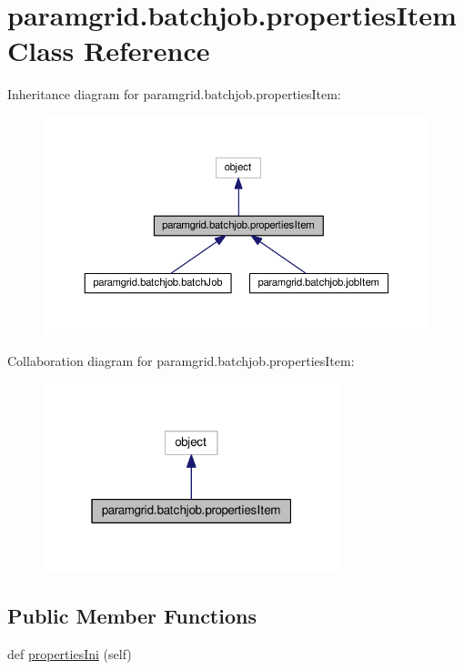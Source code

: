 \hypertarget{classparamgrid_1_1batchjob_1_1propertiesItem}{}\section{paramgrid.\+batchjob.\+properties\+Item Class Reference}
\label{classparamgrid_1_1batchjob_1_1propertiesItem}


Inheritance diagram for paramgrid.\+batchjob.\+properties\+Item\+:
\nopagebreak
\begin{figure}[H]
\begin{center}
\leavevmode
\includegraphics[width=350pt]{classparamgrid_1_1batchjob_1_1propertiesItem__inherit__graph}
\end{center}
\end{figure}


Collaboration diagram for paramgrid.\+batchjob.\+properties\+Item\+:
\nopagebreak
\begin{figure}[H]
\begin{center}
\leavevmode
\includegraphics[width=244pt]{classparamgrid_1_1batchjob_1_1propertiesItem__coll__graph}
\end{center}
\end{figure}
\subsection*{Public Member Functions}
\begin{DoxyCompactItemize}
\item 
def \mbox{\hyperlink{classparamgrid_1_1batchjob_1_1propertiesItem_af0d636693ae172d44b4bd11ecd7b2e26}{properties\+Ini}} (self)
\end{DoxyCompactItemize}


